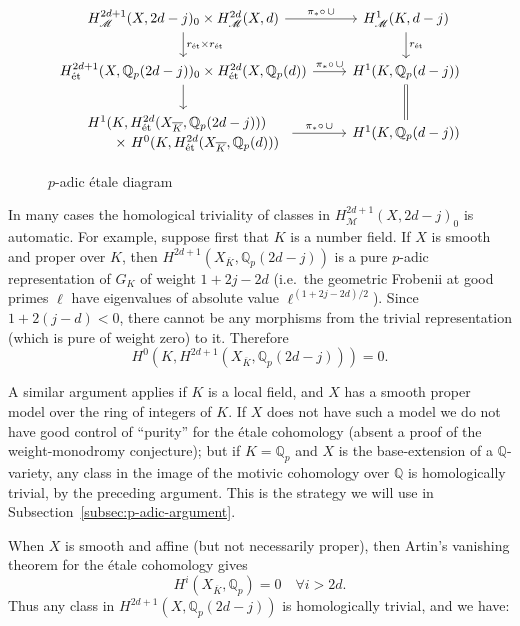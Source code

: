 \documentclass[11pt, a4paper, reqno]{amsart}
\theoremstyle{definition}
\theoremstyle{plain}
\theoremstyle{remark}
\DeclareMathOperator{\et}{\acute{e}t}
\DeclareMathOperator{\mot}{\mathscr{M}}
\newcommand{\numberset}{\mathbb}
\newcommand{\Q}{\numberset{Q}}
\newcommand{\regulator}[1]{r_{#1}}
\newcommand{\ret}{\regulator{\et}}
\begin{document}
  \begin{figure}[b]
   \centering
   \begin{mdframed}
    \caption{$p$-adic étale diagram}
    \label{diag:etale-diagram}
    \[
     \begin{tikzcd}
      H^{2d+1}_{\mot}(X,2d-j)_0 \times H^{2d}_{\mot}(X,d)
      \arrow["\pi_*\circ \, \cup"]{r}
      \arrow["\ret \times \ret"]{d} &
      H^1_{\mot}(K,d-j) \arrow[d,"\ret"] \\
      H_{\et}^{2d+1}(X, \Q_p(2d-j))_0 \times H_{\et}^{2d}(X,\Q_p(d))
      \arrow["\pi_*\circ \, \cup"]{r} \arrow{d} &
      H^1(K, \Q_p(d-j)) \arrow[equal]{d} \\
      \begin{array}{l}
       H^1(K,H_{\et}^{2d}(X_{\overline{K}}, \Q_p(2d-j))) \\[0.5ex]
       \qquad \times\ H^0(K,H_{\et}^{2d}(X_{\overline{K}},\Q_p(d)))
      \end{array} \arrow["\pi_*\circ \, \cup"]{r} &
      H^1(K,\Q_p(d-j))
     \end{tikzcd}
    \]
   \end{mdframed}
  \end{figure}

  In many cases the homological triviality of classes in $H^{2d+1}_{\mot}(X,2d-j)_0$ is automatic. For example, suppose first that $K$ is a number field. If $X$ is smooth and proper over $K$, then $H^{2d+1}_{\et}(X_{\overline{K}},\Q_p(2d-j))$ is a pure $p$-adic representation of $G_K$ of weight $1+2j-2d$ (i.e.~the geometric Frobenii at good primes $\ell$ have eigenvalues of absolute value $\ell^{(1 + 2j - 2d)/2}$). Since $1+2(j-d) < 0$, there cannot be any morphisms from the trivial representation (which is pure of weight zero) to it. Therefore
  \[
   H^0(K,H^{2d+1}_{\et}(X_{\overline{K}},\Q_p(2d-j))) = 0.
  \]

  A similar argument applies if $K$ is a local field, and $X$ has a smooth proper model over the ring of integers of $K$. If $X$ does not have such a model we do not have good control of ``purity'' for the \'etale cohomology (absent a proof of the weight-monodromy conjecture); but if $K = \Q_p$ and $X$ is the base-extension of a $\Q$-variety, any class in the image of the motivic cohomology over $\Q$ is homologically trivial, by the preceding argument. This is the strategy we will use in Subsection~\ref{subsec:p-adic-argument}.

  When $X$ is smooth and affine (but not necessarily proper), then Artin's vanishing theorem for the \'etale cohomology gives
  \[
   H^i_{\et}(X_{\overline{K}},\Q_p) = 0 \quad \forall i > 2d.
  \]
  Thus any class in $H_{\et}^{2d+1}(X,\Q_p(2d-j))$ is homologically trivial, and we have:
\end{document}

